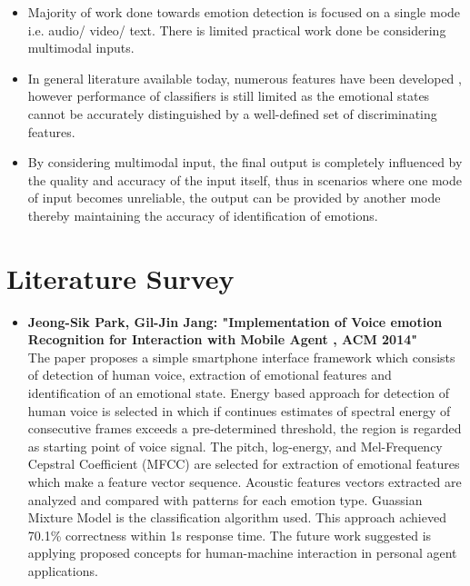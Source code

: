 \documentclass[oneside,a4paper,12pt]{report}
\begin{document}
\begin{normalsize}
\begin{itemize}
\item Majority of work done towards emotion detection is focused on a single mode i.e. audio/ video/ text. There is limited practical work done be considering multimodal inputs.

\item In general literature available today, numerous features have been developed , however performance of classifiers is still limited as the emotional states cannot be accurately distinguished by a well-defined set of discriminating features.

\item By considering multimodal input, the final output is completely influenced by the quality and accuracy of the input itself, thus in scenarios where one mode of input becomes unreliable, the output can be provided by another mode thereby maintaining the accuracy of identification of emotions.

\end{itemize}

\newpage

\section{Literature Survey}
\begin{itemize}
	\item \textbf{Jeong-Sik Park,  Gil-Jin Jang:  "Implementation of Voice emotion Recognition for Interaction with Mobile Agent , ACM 2014"} \cite{park15_implem_voice_emotion_recog_inter} \\
	The paper proposes a simple smartphone interface framework which consists of detection of human voice, extraction of emotional features and identification of an emotional state. Energy based approach for detection of human voice is selected in which if continues estimates of spectral energy of consecutive frames exceeds a pre-determined threshold, the region is regarded as starting point of voice signal. The pitch, log-energy, and Mel-Frequency Cepstral Coefficient (MFCC) are selected for extraction of emotional features which make a feature vector sequence. Acoustic features vectors extracted are analyzed and compared with patterns for each emotion type. Guassian Mixture Model is the classification algorithm used. This approach achieved 70.1\% correctness within 1s response time. The future work suggested is applying proposed concepts for human-machine interaction in personal agent applications.
	

\end{itemize}
\end{normalsize}
\end{document}
